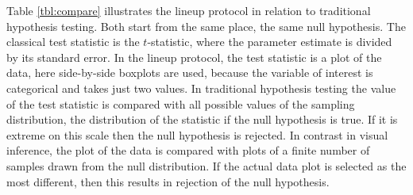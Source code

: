 \documentclass{article}
\begin{document}
Table \ref{tbl:compare} illustrates the lineup protocol in relation to traditional hypothesis testing. Both start from the same place, the same null hypothesis. The classical test statistic is the $t$-statistic, where the parameter estimate is divided by its standard error. In the lineup protocol, the test statistic is a plot of the data, here side-by-side boxplots are used, because the variable of interest is categorical and takes just two values. In traditional hypothesis testing the value of the test statistic is compared with all possible values of the sampling distribution, the distribution of the statistic if the null hypothesis is true. If it is extreme on this scale then the null hypothesis is rejected. In contrast in visual inference, the plot of the data is compared with plots of a finite number of samples drawn from the null distribution. If the actual data plot is selected as the most different, then this results in rejection of the null hypothesis.
\end{document}

